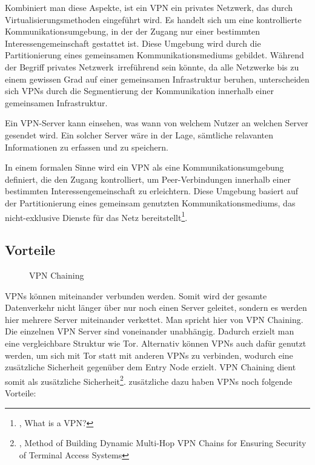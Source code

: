 Kombiniert man diese Aspekte, ist ein VPN ein privates Netzwerk, das durch Virtualisierungsmethoden eingeführt wird. Es handelt sich um eine kontrollierte Kommunikationsumgebung, in der der Zugang nur einer bestimmten Interessengemeinschaft gestattet ist. Diese Umgebung wird durch die Partitionierung eines gemeinsamen Kommunikationsmediums gebildet. Während der Begriff \glqq privates Netzwerk\grqq\ irreführend sein könnte, da alle Netzwerke bis zu einem gewissen Grad auf einer gemeinsamen Infrastruktur beruhen, unterscheiden sich VPNs durch die Segmentierung der Kommunikation innerhalb einer gemeinsamen Infrastruktur.

Ein VPN-Server kann einsehen, was wann von welchem Nutzer an welchen Server gesendet wird. Ein solcher Server wäre in der Lage, sämtliche relavanten Informationen zu erfassen und zu speichern.

In einem formalen Sinne wird ein VPN als eine Kommunikationsumgebung definiert, die den Zugang kontrolliert, um Peer-Verbindungen innerhalb einer bestimmten Interessengemeinschaft zu erleichtern. Diese Umgebung basiert auf der Partitionierung eines gemeinsam genutzten Kommunikationsmediums, das nicht-exklusive Dienste für das Netz bereitstellt\footnote{\cite{DefinitionOfVPN}, What is a VPN?}.

\subsection{Vorteile}

\begin{figure}[h!]
    \centering
    
    \caption{VPN Chaining}
    \label{imgs:vpn_chaining}
\end{figure}

VPNs können miteinander verbunden werden. Somit wird der gesamte Datenverkehr nicht länger über nur noch einen Server geleitet, sondern es werden hier mehrere Server miteinander verkettet. Man spricht hier von VPN Chaining. Die einzelnen VPN Server sind voneinander unabhängig. Dadurch erzielt man eine vergleichbare Struktur wie Tor. Alternativ können VPNs auch dafür genutzt werden, um sich mit Tor statt mit anderen VPNs zu verbinden, wodurch eine zusätzliche Sicherheit gegenüber dem Entry Node erzielt. VPN Chaining dient somit als zusätzliche Sicherheit\footnote{\cite{VPNChains}, Method of Building Dynamic Multi-Hop VPN Chains for Ensuring Security of Terminal Access Systems}.
zusätzliche dazu haben VPNs noch folgende Vorteile:

